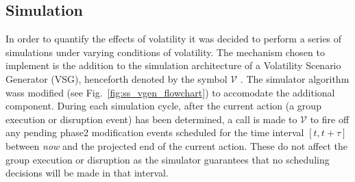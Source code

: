 \subsection{Simulation}
In order to quantify the effects of volatility it was decided to perform a series of simulations under varying conditions of volatility. The mechanism chosen to implement is the addition to the simulation architecture of a Volatility Scenario Generator (VSG), henceforth denoted by the symbol $\mathcal{V}$ . The simulator algorithm wass modified (see Fig.~\ref{fig:ss_vgen_flowchart}) to accomodate the additional component. 
During each simulation cycle, after the current action (a group execution or disruption event) has been determined, a call is made to $\mathcal{V}$ to fire off any pending phase2 modification events scheduled for the time interval $[t, t+\tau]$ between \emph{now} and the projected end of the current action. These do not affect the group execution or disruption as the simulator guarantees that no scheduling decisions will be made in that interval.

